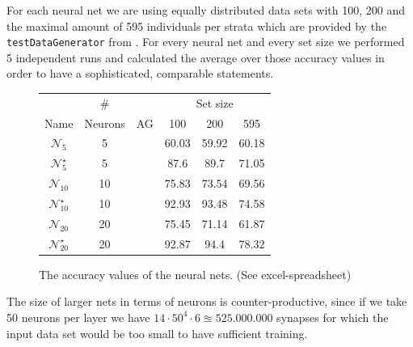 \documentclass[runningheads]{llncs}
\newcommand{\cmark}{\ding{51}}%
\newcommand{\xmark}{\ding{55}}%
\begin{document}
	For each neural net we are using equally distributed data sets with 100, 200 and the maximal amount of 595 individuals per strata which are provided by the \texttt{testDataGenerator} from . For every neural net and every set size we performed 5 independent runs and calculated the average over those accuracy values in order to have a sophisticated, comparable statements. 
	\setlength\tabcolsep{.2cm}
	\begin{figure}[H]
	\centering
	\begin{tabular}{|c|c|c|c|c|c|}
		\hline
		                         &   \#    &        & \multicolumn{3}{c|}{Set size} \\
		          Name           & Neurons &   AG   &  100  &  200  &      595      \\ \hline
		    $\mathcal{N}_5$      &    5    & \xmark & 60.03 & 59.92 &     60.18     \\
		 $\mathcal{N}_5^\star$   &    5    & \cmark & 87.6  & 89.7  &     71.05     \\
		   $\mathcal{N}_{10}$    &   10    & \xmark & 75.83 & 73.54 &     69.56     \\
		$\mathcal{N}_{10}^\star$ &   10    & \cmark & 92.93 & 93.48 &     74.58     \\		
		   $\mathcal{N}_{20}$    &   20    & \xmark & 75.45 & 71.14 &     61.87     \\
		$\mathcal{N}_{20}^\star$ &   20    & \cmark & 92.87 & 94.4  &     78.32     \\ \hline
	\end{tabular}
	\caption{The accuracy values of the neural nets. (See excel-spreadsheet)}
	\label{tab: nn-accuracy}
	\end{figure}


	The size of larger nets in terms of neurons is counter-productive, since if we take 50 neurons per layer we have $14 \cdot 50^4 \cdot 6 \approxeq 525.000.000$ synapses for which the input data set would be too small to have sufficient training.\\

\end{document}
